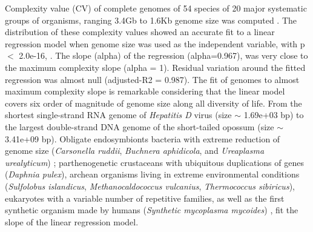 Complexity value (CV) of complete genomes of 54 species of 20 major systematic groups of organisms, ranging 3.4Gb to 1.6Kb genome size was computed . The distribution of these complexity values showed an accurate fit to a linear regression model when genome size was used as the independent variable, with p $<$ 2.0e-16, . The slope (alpha) of the regression (alpha=0.967), was very close to the maximum complexity slope (alpha = 1). Residual variation around the fitted regression was almost null (adjusted-R2 = 0.987). The fit of genomes to almost maximum complexity slope is remarkable considering that the linear model covers six order of magnitude of genome size along all diversity of life. From the shortest single-strand RNA genome of \textit{Hepatitis D} virus (size $\sim$ 1.69e+03 bp) to the largest double-strand DNA genome of the short-tailed opossum (size $\sim$ 3.41e+09 bp). Obligate endosymbionts bacteria with extreme reduction of genome size (\textit{Carsonella ruddii}, \textit{Buchnera aphidicola}, and \textit{Ureaplasma urealyticum}) \cite{Wernegreen2002}; parthenogenetic crustaceans with ubiquitous duplications of genes (\textit{Daphnia pulex}), archean organisms living in extreme environmental conditions (\textit{Sulfolobus islandicus}, \textit{Methanocaldococcus vulcanius}, \textit{Thermococcus sibiricus}), eukaryotes with a variable number of repetitive families, as well as the first synthetic organism made by humans (\textit{Synthetic mycoplasma mycoides}) \cite{Gibson2010}, fit the slope of the linear regression model. 

